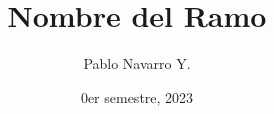 \documentclass{apuntes}
\title{Nombre del Ramo}
\author{Pablo Navarro Y.}
\date{0er semestre, 2023}
\begin{document}
\renewcommand{\onlyinsubfile}[1]{}
\renewcommand{\notinsubfile}[1]{#1}

\maketitle
\end{document}
